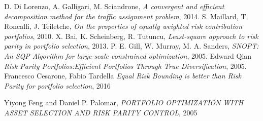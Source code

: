 D. Di Lorenzo, A. Galligari, M. Sciandrone,
  \emph{A convergent and efficient decomposition method for the traffic assignment problem},
  2014.
S. Maillard, T. Roncalli, J. Teiletche,
\emph{On the properties of equally weighted risk contribution portfolios}, 
2010.
  X. Bai, K. Scheinberg, R. Tutuncu,
  \emph{Least-square approach to risk parity in portfolio selection},
  2013.   
	P. E. Gill, W. Murray, M. A. Sanders,
	\emph{SNOPT: An SQP Algorithm for large-scale constrained optimization}, 
	2005.
Edward Qian
	\emph{Risk Parity Portfolios:Efficient Portfolios Through True Diversification}, 
	2005.
	Francesco Cesarone, Fabio Tardella
	\emph{Equal Risk Bounding is better than Risk Parity
	for portfolio selection}, 
	2016
	
	Yiyong Feng and Daniel P. Palomar,
		\emph{PORTFOLIO OPTIMIZATION WITH ASSET SELECTION AND RISK PARITY CONTROL}, 
		2005